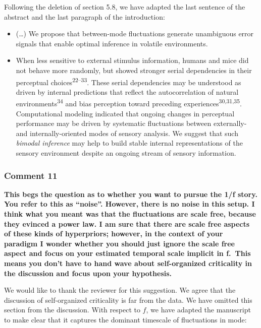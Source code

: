 \documentclass[
]{article}
\begin{document}
Following the deletion of section 5.8, we have adapted the last sentence
of the abstract and the last paragraph of the introduction:

\begin{itemize}
\item
  (\ldots) We propose that between-mode fluctuations generate
  unambiguous error signals that enable optimal inference in volatile
  environments.
\item
  When less sensitive to external stimulus information, humans and mice
  did not behave more randomly, but showed stronger serial dependencies
  in their perceptual choices\textsuperscript{22--33}. These serial
  dependencies may be understood as driven by internal predictions that
  reflect the autocorrelation of natural
  environments\textsuperscript{34} and bias perception toward preceding
  experiences\textsuperscript{30,31,35}. Computational modeling
  indicated that ongoing changes in perceptual performance may be driven
  by systematic fluctuations between externally- and internally-oriented
  modes of sensory analysis. We suggest that such \emph{bimodal
  inference} may help to build stable internal representations of the
  sensory environment despite an ongoing stream of sensory information.
\end{itemize}

\hypertarget{comment-11}{%
\subsubsection{Comment 11}\label{comment-11}}

\textbf{This begs the question as to whether you want to pursue the 1/f
story. You refer to this as ``noise''. However, there is no noise in
this setup. I think what you meant was that the fluctuations are scale
free, because they evinced a power law. I am sure that there are scale
free aspects of these kinds of hyperpriors; however, in the context of
your paradigm I wonder whether you should just ignore the scale free
aspect and focus on your estimated temporal scale implicit in f.~This
means you don't have to hand wave about self-organized criticality in
the discussion and focus upon your hypothesis.}

We would like to thank the reviewer for this suggestion. We agree that
the discussion of self-organized criticality is far from the data. We
have omitted this section from the discussion. With respect to \(f\), we
have adapted the manuscript to make clear that it captures the dominant
timescale of fluctuations in mode:
\end{document}

